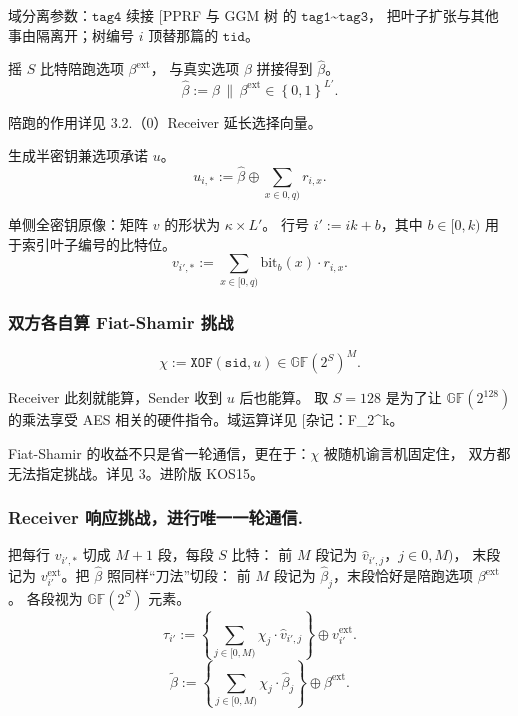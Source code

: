 域分离参数：$\mathtt{tag4}$ 续接 {[}PPRF 与 GGM 树
的 $\mathtt{tag1}$\textasciitilde{}$\mathtt{tag3}$，
把叶子扩张与其他事由隔离开；树编号 $i$ 顶替那篇的 $\mathtt{tid}$。

摇 $S$ 比特陪跑选项 $\beta^\mathrm{ext}$，
与真实选项 $\beta$ 拼接得到 $\hat\beta$。
\begin{equation}\label{eq:05-softspoken:2}
\hat\beta := \beta \,\|\, \beta^\mathrm{ext} \in \left\{0,1\right\}^{L'}.
\end{equation}

陪跑的作用详见 3.2.（0）Receiver 延长选择向量。

生成半密钥兼选项承诺 $u$。
\begin{equation}\label{eq:05-softspoken:umat}
u_{i,*} := \hat\beta \oplus \sum_{x \in 0, q)} r_{i,x}. \tag{umat}
\end{equation}

单侧全密钥原像：矩阵 $v$ 的形状为 $\kappa\times L'$。
行号 $i' := ik + b$，其中 $b \in [0, k)$ 用于索引叶子编号的比特位。
\begin{equation}\label{eq:05-softspoken:vmat}
v_{i',*} := \sum_{x \in [0, q)} \mathrm{bit}_b(x)\cdot r_{i,x}. \tag{vmat}
\end{equation}

\subsubsection{双方各自算 Fiat-Shamir 挑战}

\[
\chi := \mathtt{XOF}(\mathtt{sid},u)\in \mathbb{GF}(2^S)^M.\tag{chi}
\]

Receiver 此刻就能算，Sender 收到 $u$ 后也能算。
取 $S = 128$ 是为了让 $\mathbb{GF}(2^{128})$ 的乘法享受 AES
相关的硬件指令。域运算详见 {[}杂记：F\_2\^{}k。

Fiat-Shamir 的收益不只是省一轮通信，更在于：$\chi$ 被随机谕言机固定住，
双方都无法指定挑战。详见 3。进阶版 KOS15。

\subsubsection{Receiver 响应挑战，进行唯一一轮通信.}

把每行 $v_{i',*}$ 切成 $M+1$ 段，每段 $S$ 比特：
前 $M$ 段记为 $\hat v_{i',j}$，$j \in 0, M)$，
末段记为 $v^\mathrm{ext}_{i'}$。把 $\hat\beta$ 照同样“刀法”切段：
前 $M$ 段记为 $\hat\beta_j$，末段恰好是陪跑选项 $\beta^\mathrm{ext}$。
各段视为 $\mathbb{GF}(2^S)$ 元素。
\begin{equation}\label{eq:05-softspoken:tau-mat}
\tau_{i'} := \left\{
    \sum_{j\in[0,M)} \chi_j \cdot\hat v_{i',j}
\right\}
\oplus v^\mathrm{ext}_{i'}. \tag{tau-mat}
\end{equation}
\begin{equation}\label{eq:05-softspoken:beta-tilde}
\tilde\beta := \left\{
    \sum_{j\in[0,M)} \chi_j \cdot \hat\beta_j
\right\} \oplus \beta^\mathrm{ext}. \tag{beta-tilde}
\end{equation}

